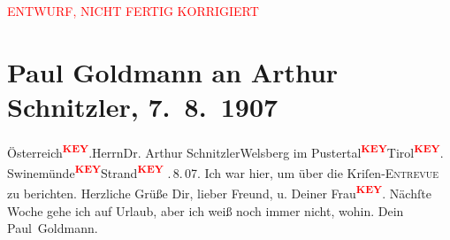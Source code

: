 
\begin{center}
            \textcolor{red}{ENTWURF, NICHT FERTIG KORRIGIERT}
                      \end{center}
            
         \renewcommand{\erwaehnteOrte}{Orte: Berlin, Wien}
         \renewcommand{\erwaehnteWerke}{}
               \section[Paul Goldmann an Arthur Schnitzler, 7. 8. 1907]{ Paul Goldmann an Arthur Schnitzler, 7. 8. 1907}\nopagebreak{}\rehead{ }\begin{ledgroupsized}[t]{13cm}\normalsize\beginnumbering \toendnotes[C]{\smallbreak\pagebreak[2]} 
\pstart
           \noindent{}{\pb}\pstart{} Österreich\textcolor{red}{\textsuperscript{\textbf{KEY}}}.\pend{}\pstart{}Herrn\pend{}\pstart{}Dr. Arthur Schnitzler\pend{}\pstart{}Welsberg im Pustertal\textcolor{red}{\textsuperscript{\textbf{KEY}}}\pend{}\pstart{}Tirol\textcolor{red}{\textsuperscript{\textbf{KEY}}}.\pend{}{\pb}\pend
           \pstart
           Swinemünde\textcolor{red}{\textsuperscript{\textbf{KEY}}}Strand\textcolor{red}{\textsuperscript{\textbf{KEY}}}\pend
           \pstart
           . 8. 07.\pend
            Ich war hier, um über die Kriſen-\textsc{Entrevue} zu berichten. Herzliche Grüße Dir, lieber
                  Freund, u. Deiner Frau\textcolor{red}{\textsuperscript{\textbf{KEY}}}. Nächſte Woche gehe
               ich auf Urlaub, aber ich weiß noch immer nicht, wohin. Dein \spacefill\mbox{Paul Goldmann.
               }\pend
           
         
         \endnumbering{}\end{ledgroupsized}\begin{anhang}\end{anhang}\newcommand{\dateiname}{L03255}\newcommand{\titel}{Paul Goldmann an Arthur Schnitzler, 7. 8. 1907}\newcommand{\editorInnen}{Martin Anton Müller und Laura Untner}
      